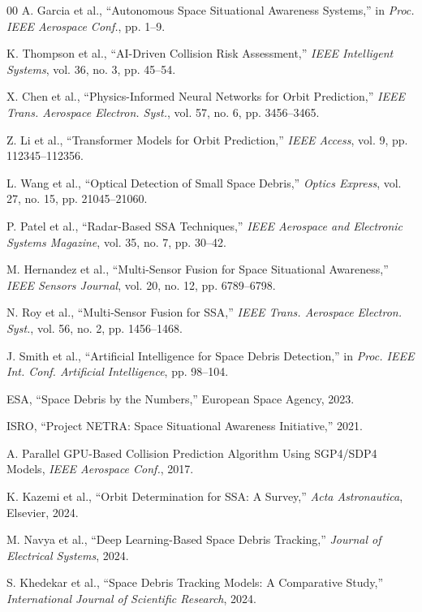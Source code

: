 \documentclass{ieeeaccess}
\begin{document}
\begin{thebibliography}{00}
 A. Garcia et al., “Autonomous Space Situational Awareness Systems,” in \emph{Proc. IEEE Aerospace Conf.}, pp. 1--9.

 K. Thompson et al., “AI-Driven Collision Risk Assessment,” \emph{IEEE Intelligent Systems}, vol. 36, no. 3, pp. 45--54.

 X. Chen et al., “Physics-Informed Neural Networks for Orbit Prediction,” \emph{IEEE Trans. Aerospace Electron. Syst.}, vol. 57, no. 6, pp. 3456--3465.

 Z. Li et al., “Transformer Models for Orbit Prediction,” \emph{IEEE Access}, vol. 9, pp. 112345--112356.

 L. Wang et al., “Optical Detection of Small Space Debris,” \emph{Optics Express}, vol. 27, no. 15, pp. 21045--21060.

 P. Patel et al., “Radar-Based SSA Techniques,” \emph{IEEE Aerospace and Electronic Systems Magazine}, vol. 35, no. 7, pp. 30--42.

 M. Hernandez et al., “Multi-Sensor Fusion for Space Situational Awareness,” \emph{IEEE Sensors Journal}, vol. 20, no. 12, pp. 6789--6798.

 N. Roy et al., “Multi-Sensor Fusion for SSA,” \emph{IEEE Trans. Aerospace Electron. Syst.}, vol. 56, no. 2, pp. 1456--1468.

 J. Smith et al., “Artificial Intelligence for Space Debris Detection,” in \emph{Proc. IEEE Int. Conf. Artificial Intelligence}, pp. 98--104.

 ESA, “Space Debris by the Numbers,” European Space Agency, 2023.

 ISRO, “Project NETRA: Space Situational Awareness Initiative,” 2021.

 A. Parallel GPU-Based Collision Prediction Algorithm Using SGP4/SDP4 Models, \emph{IEEE Aerospace Conf.}, 2017.

 K. Kazemi et al., “Orbit Determination for SSA: A Survey,” \emph{Acta Astronautica}, Elsevier, 2024.

 M. Navya et al., “Deep Learning-Based Space Debris Tracking,” \emph{Journal of Electrical Systems}, 2024.

 S. Khedekar et al., “Space Debris Tracking Models: A Comparative Study,” \emph{International Journal of Scientific Research}, 2024.

\end{thebibliography}

\EOD
\end{document}
